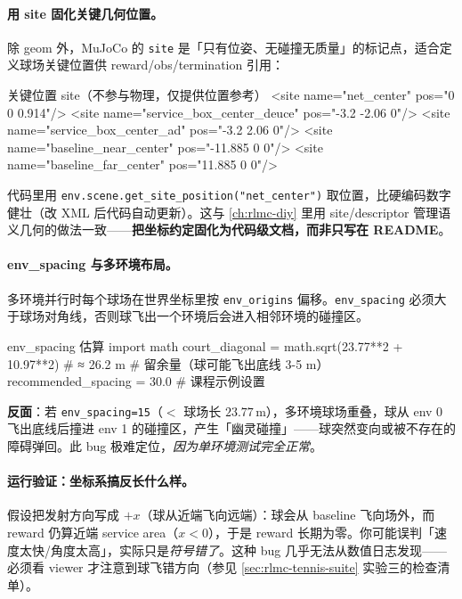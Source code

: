 \paragraph{用 site 固化关键几何位置。}除 geom 外，MuJoCo 的 \verb|site| 是「只有位姿、无碰撞无质量」的标记点，适合定义球场关键位置供 reward/obs/termination 引用：

\begin{codebox}[text]{关键位置 site（不参与物理，仅提供位置参考）}
<site name="net_center"               pos="0 0 0.914"/>
<site name="service_box_center_deuce" pos="-3.2 -2.06 0"/>
<site name="service_box_center_ad"    pos="-3.2  2.06 0"/>
<site name="baseline_near_center"     pos="-11.885 0 0"/>
<site name="baseline_far_center"      pos="11.885 0 0"/>
\end{codebox}

代码里用 \verb|env.scene.get_site_position("net_center")| 取位置，比硬编码数字健壮（改 XML 后代码自动更新）。这与 \cref{ch:rlmc-diy} 里用 site/descriptor 管理语义几何的做法一致——\textbf{把坐标约定固化为代码级文档，而非只写在 README}。

\paragraph{env\_spacing 与多环境布局。}多环境并行时每个球场在世界坐标里按 \verb|env_origins| 偏移。\verb|env_spacing| 必须大于球场对角线，否则球飞出一个环境后会进入相邻环境的碰撞区。

\begin{codebox}[Python]{env\_spacing 估算}
import math
court_diagonal = math.sqrt(23.77**2 + 10.97**2)  # ≈ 26.2 m
# 留余量（球可能飞出底线 3-5 m）
recommended_spacing = 30.0  # 课程示例设置
\end{codebox}

\textbf{反面}：若 \verb|env_spacing=15|（$<$ 球场长 $23.77$\,m），多环境球场重叠，球从 env 0 飞出底线后撞进 env 1 的碰撞区，产生「幽灵碰撞」——球突然变向或被不存在的障碍弹回。此 bug 极难定位，\emph{因为单环境测试完全正常}。

\paragraph{运行验证：坐标系搞反长什么样。}假设把发射方向写成 $+x$（球从近端飞向远端）：球会从 baseline 飞向场外，而 reward 仍算近端 service area（$x<0$），于是 reward 长期为零。你可能误判「速度太快/角度太高」，实际只是\emph{符号错了}。这种 bug 几乎无法从数值日志发现——必须看 viewer 才注意到球飞错方向（参见 \cref{sec:rlmc-tennis-suite} 实验三的检查清单）。

